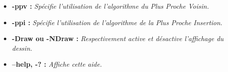 \documentclass{article}
\begin{document}
\begin{itemize}
\item \textbf{-ppv :} \emph{Spécifie l'utilisation de l'algorithme du Plus Proche Voisin.}\smallskip

\item \textbf{-ppi :} \emph{Spécifie l'utilisation de l'algorithme de la Plus Proche Insertion.}\smallskip

\item \textbf{-Draw ou -NDraw :} \emph{Respectivement active et désactive l'affichage du dessin.}\smallskip

\item \textbf{--help, -? :} \emph{Affiche cette aide.}
\end{itemize}															
							
\end{document}
